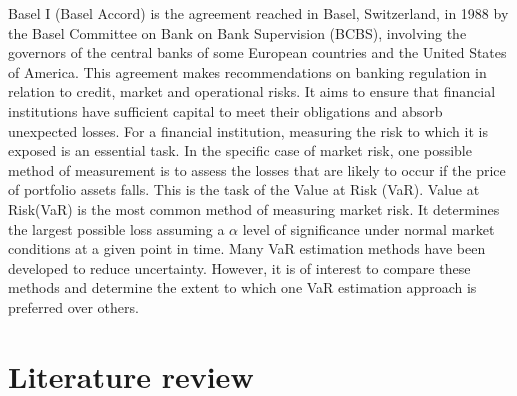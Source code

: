 \documentclass[a4paper,11pt,oneside]{book}
\begin{document}
Basel I (Basel Accord) is the agreement reached in Basel, Switzerland, in 1988 by the Basel Committee on Bank
on Bank Supervision (BCBS), involving the governors of the central banks of some European countries and the United States of America. This agreement makes recommendations on banking regulation in relation to credit, market and operational risks. It aims to ensure that financial institutions have sufficient capital to meet their obligations and absorb unexpected losses. \newline\newline
For a financial institution, measuring the risk to which it is exposed is an essential task. In the specific case of market risk, one possible method of measurement is to assess the losses that are likely to occur if the price of portfolio assets falls. This is the task of the Value at Risk
(VaR).
Value at Risk(VaR) is the most common method of measuring market risk. It determines the largest possible loss assuming a $\alpha$ level of significance under normal market conditions at a given point in time.\newline\newline
Many VaR estimation methods have been developed to reduce uncertainty. However, it is of interest to compare these methods and determine the extent to which one VaR estimation approach is preferred over others.









\section{Literature review}
\end{document}
